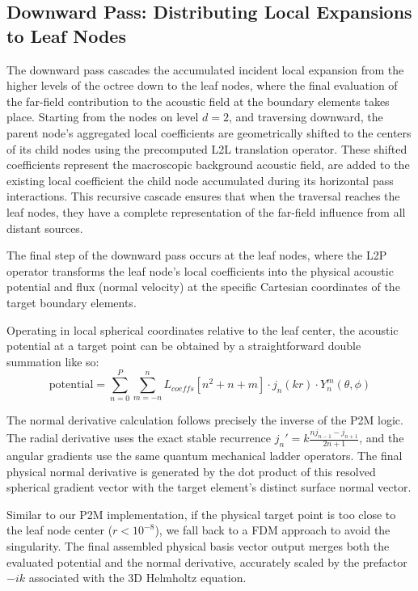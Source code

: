 \subsection{Downward Pass: Distributing Local Expansions to Leaf Nodes} \label{downward-pass}
The downward pass cascades the accumulated incident local expansion from the higher levels of the octree down to the leaf nodes, where the final evaluation of the far-field contribution to the acoustic field at the boundary elements takes place. 
 Starting from the nodes on level $d=2$, and traversing downward, the parent node's aggregated local coefficients are geometrically shifted to the centers of its child nodes using the precomputed \ac{L2L} translation operator. These shifted coefficients represent the macroscopic background acoustic field, are added to the existing local coefficient the child node accumulated during its horizontal pass interactions. This recursive cascade ensures that when the traversal reaches the leaf nodes, they have a complete representation of the far-field influence from all distant sources.

 The final step of the downward pass occurs at the leaf nodes, where the \ac{L2P}
 operator transforms the leaf node's local coefficients into the physical acoustic potential and flux (normal velocity) at the specific Cartesian coordinates of the target boundary elements.

 Operating in local spherical coordinates relative to the leaf center, the acoustic potential at a target point can be obtained by a straightforward double summation like so:
\begin{equation}
    \text{potential} = \sum_{n=0}^{P} \sum_{m=-n}^{n} L_{coeffs}\left[n^2 + n + m \right] \cdot j_n(kr) \cdot Y_n^m(\theta, \phi)
\end{equation}

The normal derivative calculation follows precisely the inverse of the \ac{P2M} logic.
The radial derivative uses the exact stable recurrence $j_n' = k \frac{n j_{n-1}-j_{n+1}}{2n +1}$, and the angular gradients use the same quantum mechanical ladder operators. The final physical normal derivative is generated by the dot product of this resolved spherical gradient vector with the target element's distinct surface normal vector.

Similar to our \ac{P2M} implementation, if the physical target point is too close to the leaf node center ($r < 10^{-8}$), we fall back to a \ac{FDM} approach to avoid the singularity. The final assembled physical basis vector output merges both the evaluated potential and the normal derivative, accurately scaled by the prefactor $-ik$ associated with the 3D Helmholtz equation.


